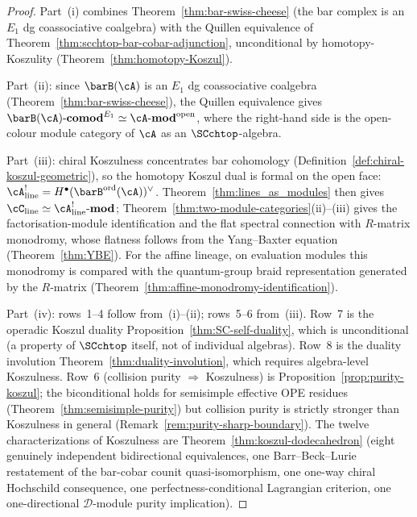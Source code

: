 \begin{proof}
Part~(i) combines Theorem~\ref{thm:bar-swiss-cheese} (the bar complex
is an $E_1$ dg coassociative coalgebra) with the Quillen equivalence of
Theorem~\ref{thm:scchtop-bar-cobar-adjunction}, unconditional by
homotopy-Koszulity (Theorem~\ref{thm:homotopy-Koszul}).

Part~(ii): since $\barB(\cA)$ is an $E_1$ dg coassociative coalgebra
(Theorem~\ref{thm:bar-swiss-cheese}), the Quillen equivalence gives
$\barB(\cA)\text{-}\mathbf{comod}^{E_1}
\simeq \cA\text{-}\mathbf{mod}^{\mathrm{open}}$,
where the right-hand side is the open-colour module category of $\cA$
as an $\SCchtop$-algebra.

Part~(iii): chiral Koszulness concentrates bar cohomology
(Definition~\ref{def:chiral-koszul-geometric}), so the homotopy
Koszul dual is formal on the open face:
$\cA^!_{\mathrm{line}} = H^\bullet(\barB^{\mathrm{ord}}(\cA))^\vee$.
Theorem~\ref{thm:lines_as_modules} then gives
$\cC_{\mathrm{line}} \simeq \cA^!_{\mathrm{line}}\text{-}\mathbf{mod}$;
Theorem~\ref{thm:two-module-categories}(ii)--(iii) gives the
factorisation-module identification and the flat spectral connection
with $R$-matrix monodromy, whose flatness follows from the
Yang--Baxter equation (Theorem~\ref{thm:YBE}).
For the affine lineage, on evaluation modules this monodromy
is compared with the quantum-group braid representation generated by the
$R$-matrix \textup{(}Theorem~\textup{\ref{thm:affine-monodromy-identification}}\textup{)}.

Part~(iv): rows~1--4 follow from~(i)--(ii); rows~5--6
from~(iii). Row~7 is the operadic Koszul duality
Proposition~\ref{thm:SC-self-duality}, which is unconditional
(a property of $\SCchtop$ itself, not of individual algebras).
Row~8 is the duality involution
Theorem~\ref{thm:duality-involution}, which requires
algebra-level Koszulness.
Row~6 (collision purity $\Rightarrow$ Koszulness) is
Proposition~\ref{prop:purity-koszul}; the biconditional holds for
semisimple effective OPE residues
(Theorem~\ref{thm:semisimple-purity}) but collision purity is
strictly stronger than Koszulness in general
(Remark~\ref{rem:purity-sharp-boundary}).
The twelve characterizations of Koszulness are
Theorem~\ref{thm:koszul-dodecahedron} (eight genuinely independent
bidirectional equivalences, one Barr--Beck--Lurie restatement of
the bar-cobar counit quasi-isomorphism, one one-way chiral
Hochschild consequence, one perfectness-conditional Lagrangian
criterion, one one-directional $\mathcal{D}$-module purity
implication).
\end{proof}

